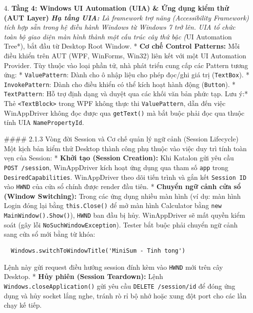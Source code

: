 4. \textbf{Tầng 4: Windows UI Automation (UIA) & Ứng dụng kiểm thử (AUT Layer)}
   \textit{ \textbf{Hạ tầng UIA:} Là framework trợ năng (Accessibility Framework) tích hợp sẵn trong hệ điều hành Windows từ Windows 7 trở lên. UIA tổ chức toàn bộ giao diện màn hình thành một cấu trúc cây thứ bậc (}UI Automation Tree*), bắt đầu từ Desktop Root Window.
   * \textbf{Cơ chế Control Patterns:} Mỗi điều khiển trên AUT (WPF, WinForms, Win32) liên kết với một UI Automation Provider. Tùy thuộc vào loại phần tử, nhà phát triển cung cấp các Pattern tương ứng:
     * \texttt{ValuePattern}: Dành cho ô nhập liệu cho phép đọc/ghi giá trị (\texttt{TextBox}).
     * \texttt{InvokePattern}: Dành cho điều khiển có thể kích hoạt hành động (\texttt{Button}).
     * \texttt{TextPattern}: Hỗ trợ định dạng và duyệt qua các khối văn bản phức tạp.
     \textit{ }Lưu ý:* Thẻ \texttt{<TextBlock>} trong WPF không thực thi \texttt{ValuePattern}, dẫn đến việc WinAppDriver không đọc được qua \texttt{getText()} mà bắt buộc phải đọc qua thuộc tính UIA \texttt{NamePropertyId}.

#### 2.1.3 Vòng đời Session và Cơ chế quản lý ngữ cảnh (Session Lifecycle)
Một kịch bản kiểm thử Desktop thành công phụ thuộc vào việc duy trì tính toàn vẹn của Session:
* \textbf{Khởi tạo (Session Creation):} Khi Katalon gửi yêu cầu \texttt{POST /session}, WinAppDriver kích hoạt ứng dụng qua tham số \texttt{app} trong \texttt{DesiredCapabilities}. WinAppDriver theo dõi tiến trình và gắn kết \texttt{Session ID} vào \texttt{HWND} của cửa sổ chính được render đầu tiên.
* \textbf{Chuyển ngữ cảnh cửa sổ (Window Switching):} Trong các ứng dụng nhiều màn hình (ví dụ: màn hình Login đóng lại bằng \texttt{this.Close()} để mở màn hình Calculator bằng \texttt{new MainWindow().Show()}), \texttt{HWND} ban đầu bị hủy. WinAppDriver sẽ mất quyền kiểm soát (gây lỗi \texttt{NoSuchWindowException}). Tester bắt buộc phải chuyển ngữ cảnh sang cửa sổ mới bằng từ khóa:
\begin{lstlisting}
  Windows.switchToWindowTitle('MiniSum - Tinh tong')
\end{lstlisting}

  Lệnh này gửi request điều hướng session đính kèm vào \texttt{HWND} mới trên cây Desktop.
* \textbf{Hủy phiên (Session Teardown):} Lệnh \texttt{Windows.closeApplication()} gửi yêu cầu \texttt{DELETE /session/{id}} để đóng ứng dụng và hủy socket lắng nghe, tránh rò rỉ bộ nhớ hoặc xung đột port cho các lần chạy kế tiếp.

